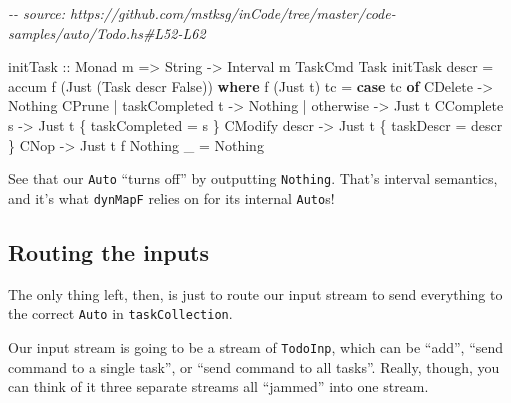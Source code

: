 \documentclass[]{article}
\newenvironment{Shaded}{}{}
\newcommand{\CommentTok}[1]{\textcolor[rgb]{0.38,0.63,0.69}{\textit{#1}}}
\newcommand{\DataTypeTok}[1]{\textcolor[rgb]{0.56,0.13,0.00}{#1}}
\newcommand{\FunctionTok}[1]{\textcolor[rgb]{0.02,0.16,0.49}{#1}}
\newcommand{\KeywordTok}[1]{\textcolor[rgb]{0.00,0.44,0.13}{\textbf{#1}}}
\newcommand{\NormalTok}[1]{#1}
\newcommand{\OperatorTok}[1]{\textcolor[rgb]{0.40,0.40,0.40}{#1}}
\newcommand{\OtherTok}[1]{\textcolor[rgb]{0.00,0.44,0.13}{#1}}
\begin{document}
\begin{Shaded}
\begin{Highlighting}[]
\CommentTok{{-}{-} source: https://github.com/mstksg/inCode/tree/master/code{-}samples/auto/Todo.hs\#L52{-}L62}

\OtherTok{initTask ::} \DataTypeTok{Monad}\NormalTok{ m }\OtherTok{=\textgreater{}} \DataTypeTok{String} \OtherTok{{-}\textgreater{}} \DataTypeTok{Interval}\NormalTok{ m }\DataTypeTok{TaskCmd} \DataTypeTok{Task}
\NormalTok{initTask descr }\OtherTok{=}\NormalTok{ accum f (}\DataTypeTok{Just}\NormalTok{ (}\DataTypeTok{Task}\NormalTok{ descr }\DataTypeTok{False}\NormalTok{))}
  \KeywordTok{where}
\NormalTok{    f (}\DataTypeTok{Just}\NormalTok{ t) tc }\OtherTok{=} \KeywordTok{case}\NormalTok{ tc }\KeywordTok{of}
                      \DataTypeTok{CDelete}                  \OtherTok{{-}\textgreater{}} \DataTypeTok{Nothing}
                      \DataTypeTok{CPrune} \OperatorTok{|}\NormalTok{ taskCompleted t }\OtherTok{{-}\textgreater{}} \DataTypeTok{Nothing}
                             \OperatorTok{|} \FunctionTok{otherwise}       \OtherTok{{-}\textgreater{}} \DataTypeTok{Just}\NormalTok{ t}
                      \DataTypeTok{CComplete}\NormalTok{ s              }\OtherTok{{-}\textgreater{}} \DataTypeTok{Just}\NormalTok{ t \{ taskCompleted }\OtherTok{=}\NormalTok{ s \}}
                      \DataTypeTok{CModify}\NormalTok{ descr            }\OtherTok{{-}\textgreater{}} \DataTypeTok{Just}\NormalTok{ t \{ taskDescr }\OtherTok{=}\NormalTok{ descr \}}
                      \DataTypeTok{CNop}                     \OtherTok{{-}\textgreater{}} \DataTypeTok{Just}\NormalTok{ t}
\NormalTok{    f }\DataTypeTok{Nothing}\NormalTok{ \_   }\OtherTok{=} \DataTypeTok{Nothing}
\end{Highlighting}
\end{Shaded}

See that our \texttt{Auto} ``turns off'' by outputting \texttt{Nothing}. That's
interval semantics, and it's what \texttt{dynMapF} relies on for its internal
\texttt{Auto}s!

\subsection{Routing the inputs}\label{routing-the-inputs}

The only thing left, then, is just to route our input stream to send everything
to the correct \texttt{Auto} in \texttt{taskCollection}.

Our input stream is going to be a stream of \texttt{TodoInp}, which can be
``add'', ``send command to a single task'', or ``send command to all tasks''.
Really, though, you can think of it three separate streams all ``jammed'' into
one stream.
\end{document}

